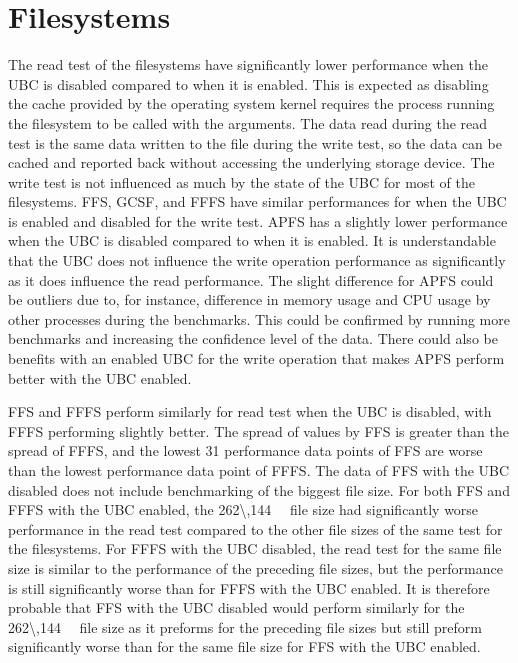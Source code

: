 \section{Filesystems}
\label{sec:dis_fs}

The read test of the filesystems have significantly lower performance when the \gls{UBC} is disabled compared to when it is enabled. This is expected as disabling the cache provided by the operating system kernel requires the process running the filesystem to be called with the arguments. The data read during the read test is the same data written to the file during the write test, so the data can be cached and reported back without accessing the underlying storage device. The write test is not influenced as much by the state of the \gls{UBC} for most of the filesystems. \gls{FFS}, \gls{GCSF}, and \gls{FFFS} have similar performances for when the \gls{UBC} is enabled and disabled for the write test. \gls{APFS} has a slightly lower performance when the \gls{UBC} is disabled compared to when it is enabled. It is understandable that the \gls{UBC} does not influence the write operation performance as significantly as it does influence the read performance. The slight difference for \gls{APFS} could be outliers due to, for instance, difference in memory usage and CPU usage by other processes during the benchmarks. This could be confirmed by running more benchmarks and increasing the confidence level of the data. There could also be benefits with an enabled \gls{UBC} for the write operation that makes \gls{APFS} perform better with the \gls{UBC} enabled.

\gls{FFS} and \gls{FFFS} perform similarly for read test when the \gls{UBC} is disabled, with \gls{FFFS} performing slightly better. The spread of values by \gls{FFS} is greater than the spread of \gls{FFFS}, and the lowest 31 performance data points of \gls{FFS} are worse than the lowest performance data point of \gls{FFFS}. The data of \gls{FFS} with the \gls{UBC} disabled does not include benchmarking of the biggest file size. For both \gls{FFS} and \gls{FFFS} with the \gls{UBC} enabled, the \SI{262\,144}{\kilo\byte} file size had significantly worse performance in the read test compared to the other file sizes of the same test for the filesystems. For \gls{FFFS} with the \gls{UBC} disabled, the read test for the same file size is similar to the performance of the preceding file sizes, but the performance is still significantly worse than for \gls{FFFS} with the \gls{UBC} enabled. It is therefore probable that \gls{FFS} with the \gls{UBC} disabled would perform similarly for the \SI{262\,144}{\kilo\byte} file size as it preforms for the preceding file sizes but still preform significantly worse than for the same file size for \gls{FFS} with the \gls{UBC} enabled.

